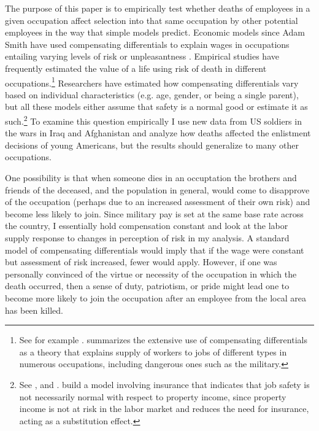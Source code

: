 \documentclass[12pt] {article}
\begin{document}
The purpose of this paper is to empirically test whether deaths of employees in a given occupation affect selection into that same occupation by other potential employees in the way that simple models predict. Economic models since Adam Smith have used compensating differentials to explain wages in occupations entailing varying levels of risk or unpleasantness \citep{AdamSmith}. Empirical studies have frequently estimated  the value of a life using risk of death in different occupations.\footnote{See for example \cite{thaler1976value}. \cite{RosenOccChoiceHandbook} summarizes the extensive use of compensating differentials as a theory that explains supply of workers to jobs of different types in numerous occupations, including dangerous ones such as the military.} Researchers have estimated how compensating differentials vary based on individual characteristics (e.g. age, gender, or being a single parent), but all these models either assume that safety is a normal good or estimate it as such.\footnote{See \cite{DeLeireLevy2004}, \cite{BiddleZarkin} and \cite{garen1988compensating}. \cite{thaler1976value} build a model involving insurance that indicates that job safety is not necessarily normal with respect to property income, since property income is not at risk in the labor market and reduces the need for insurance, acting as a substitution effect.} To examine this question empirically I use new data from US soldiers in the wars in Iraq and Afghanistan and analyze how deaths affected the enlistment decisions of young Americans, but the results should generalize to many other occupations.

One possibility is that when someone dies in an occuptation the brothers and friends of the deceased, and the population in general, would come to disapprove of the occupation (perhaps due to an increased assessment of their own risk) and become less likely to join. Since military pay is set at the same base rate across the country, I essentially hold compensation constant and look at the labor supply response to changes in perception of risk in my analysis. A standard model of compensating differentials would imply that if the wage were constant but assessment of risk increased, fewer would apply. However, if one was personally convinced of the virtue or necessity of the occupation in which the death occurred, then a sense of duty, patriotism, or pride might lead one to become more likely to join the occupation after an employee from the local area has been killed.  
\end{document}
